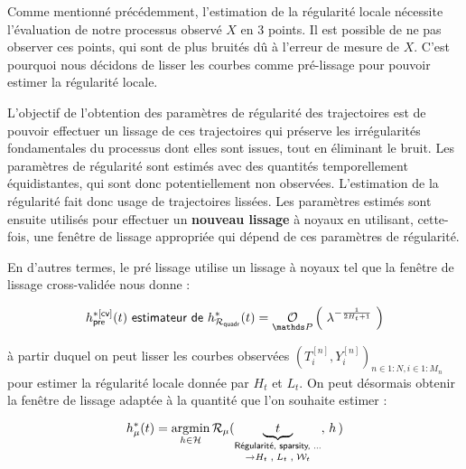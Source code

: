 
Comme mentionné précédemment, l'estimation de la régularité locale nécessite l'évaluation de notre processus observé $X$ en 3 points. Il est possible de ne pas observer ces points, qui sont de plus bruités dû à l'erreur de mesure de $X$. C'est pourquoi nous décidons de lisser les courbes comme \og pré-lissage \fg pour pouvoir estimer la régularité locale.


L'objectif de l'obtention des paramètres de régularité des trajectoires est de pouvoir effectuer un lissage de ces trajectoires qui préserve les irrégularités fondamentales du processus dont elles sont issues, tout en éliminant le bruit. Les paramètres de régularité sont estimés avec des quantités temporellement équidistantes, qui sont donc potentiellement non observées. L'estimation de la régularité fait donc usage de trajectoires lissées. Les paramètres estimés sont ensuite utilisés pour effectuer un \textbf{nouveau lissage} à noyaux en utilisant, cette-fois, une fenêtre de lissage appropriée qui dépend de ces paramètres de régularité.

\smallskip

\noindent En d'autres termes, le pré lissage utilise un lissage à noyaux tel que la fenêtre de lissage cross-validée nous donne :

\begin{equation}
	h^{*[\textsf{cv}]}_{\textsf{pre}}(t) \textsf{ estimateur de } h^*_{\mathcal R_{\textsf{quadr}}}(t) = \grandop{ \lambda^{- \frac 1 {2  H_t + 1}}} \label{eq:h_cross_noyau_pre}
\end{equation}

\noindent à partir duquel on peut lisser les courbes observées $( T_i^{[n]}, Y_i^{[n]} )_{n \in 1:N, i \in 1:M_n}$ pour estimer la régularité locale donnée par $H_t$ et $L_t$. On peut désormais obtenir la fenêtre de lissage adaptée à la quantité que l'on souhaite estimer :

\begin{equation}
	h_\mu^*(t) = \argmin\limits_{h \in \mathcal H} \mathcal R_\mu(\underset {\rightarrow H_t \;, \; L_t \; , \; \mathcal W_t}{\underbrace{\quad t \quad}_{\textsf{Régularité, sparsity, ...}}}, \, h \, )
\end{equation}



